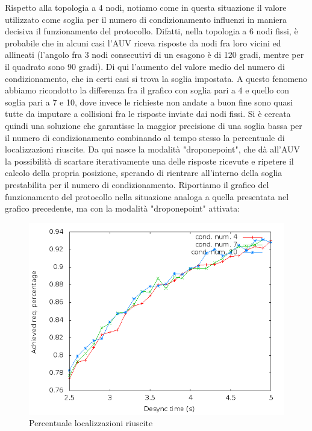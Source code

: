 \documentclass[Lau,binding=0.6cm]{sapthesis}
\begin{document}
Rispetto alla topologia a 4 nodi, notiamo come in questa situazione il valore utilizzato come soglia per il numero di condizionamento influenzi in maniera decisiva il funzionamento del protocollo. Difatti, nella topologia a 6 nodi fissi, è probabile che in alcuni casi l'AUV riceva risposte da nodi fra loro vicini ed allineati (l'angolo fra 3 nodi consecutivi di un esagono è di 120 gradi, mentre per il quadrato sono 90 gradi). Di qui l'aumento del valore medio del numero di condizionamento, che in certi casi si trova la soglia impostata. A questo fenomeno abbiamo ricondotto la differenza fra il grafico con soglia pari a 4 e quello con soglia pari a 7 e 10, dove invece le richieste non andate a buon fine sono quasi tutte da imputare a collisioni fra le risposte inviate dai nodi fissi.
Si è cercata quindi una soluzione che garantisse la maggior precisione di una soglia bassa per il numero di condizionamento combinando al tempo stesso la percentuale di localizzazioni riuscite.
Da qui nasce la modalità "droponepoint", che dà all'AUV la possibilità di scartare iterativamente una delle risposte ricevute e ripetere il calcolo della propria posizione, sperando di rientrare all'interno della soglia prestabilita per il numero di condizionamento. Riportiamo il grafico del funzionamento del protocollo nella situazione analoga a quella presentata nel grafico precedente, ma con la modalità "droponepoint" attivata:
\begin{figure}[H]
    \centering
    \includegraphics[scale=0.5]{hexagonsimulation/achievedlocreq3preempt0drop1speed0.png}
    \caption{Percentuale localizzazioni riuscite}
    \label{fig:hexagonsimulation/achievedlocreq3preempt0drop1speed0}
\end{figure}
\end{document}
